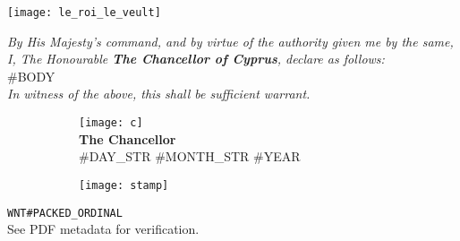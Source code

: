 \documentclass[varwidth=true,border=50pt]{standalone}
\begin{document}
\noindent \texttt{[image: le\_roi\_le\_veult]}

\vspace{10pt}

\textit{By His Majesty's command, and by virtue of the authority given me by the same, I, The Honourable \textbf{The Chancellor of Cyprus}, declare as follows:}\\

#BODY\\

\textit{In witness of the above, this shall be sufficient warrant.}

\vspace{20pt}

\begin{figure}
\centering
\begin{subfigure}{.5\textwidth}
    \centering
    \texttt{[image: c]}\\
    \vspace{5pt}
    \textbf{The Chancellor}\\
    #DAY_STR #MONTH_STR #YEAR
\end{subfigure}%
\begin{subfigure}{.5\textwidth}
    \centering
    \texttt{[image: stamp]}
\end{subfigure}%
\end{figure}

\vspace{30pt}

\hfill {\footnotesize \texttt{WNT#PACKED_ORDINAL}}\\

{\tiny See PDF metadata for verification.}
\end{document}
